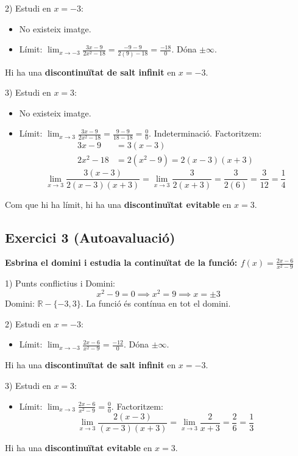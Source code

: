 \documentclass[12pt,a4paper]{article}
\begin{document}
2) Estudi en $x=-3$:
\begin{itemize}
    \item No existeix imatge.
    \item Límit: $\lim_{x \to -3} \frac{3x-9}{2x^2-18} = \frac{-9-9}{2(9)-18} = \frac{-18}{0}$. Dóna $\pm \infty$.
\end{itemize}
Hi ha una \textbf{discontinuïtat de salt infinit} en $x=-3$.

3) Estudi en $x=3$:
\begin{itemize}
    \item No existeix imatge.
    \item Límit: $\lim_{x \to 3} \frac{3x-9}{2x^2-18} = \frac{9-9}{18-18} = \frac{0}{0}$. Indeterminació. Factoritzem:
    \begin{align*}
        3x-9 &= 3(x-3) \\
        2x^2-18 &= 2(x^2-9) = 2(x-3)(x+3)
    \end{align*}
    \[ \lim_{x \to 3} \frac{3(x-3)}{2(x-3)(x+3)} = \lim_{x \to 3} \frac{3}{2(x+3)} = \frac{3}{2(6)} = \frac{3}{12} = \frac{1}{4} \]
\end{itemize}
Com que hi ha límit, hi ha una \textbf{discontinuïtat evitable} en $x=3$.

\vspace{0.5cm}

\subsection{Exercici 3 (Autoavaluació)}

\textbf{Esbrina el domini i estudia la continuïtat de la funció: $f(x) = \frac{2x-6}{x^2-9}$}

1) Punts conflictius i Domini:
\[ x^2-9 = 0 \implies x^2 = 9 \implies x = \pm 3 \]
Domini: $\mathbb{R} - \{-3, 3\}$. La funció és contínua en tot el domini.

2) Estudi en $x=-3$:
\begin{itemize}
    \item Límit: $\lim_{x \to -3} \frac{2x-6}{x^2-9} = \frac{-12}{0}$. Dóna $\pm \infty$.
\end{itemize}
Hi ha una \textbf{discontinuïtat de salt infinit} en $x=-3$.

3) Estudi en $x=3$:
\begin{itemize}
    \item Límit: $\lim_{x \to 3} \frac{2x-6}{x^2-9} = \frac{0}{0}$. Factoritzem:
    \[ \lim_{x \to 3} \frac{2(x-3)}{(x-3)(x+3)} = \lim_{x \to 3} \frac{2}{x+3} = \frac{2}{6} = \frac{1}{3} \]
\end{itemize}
Hi ha una \textbf{discontinuïtat evitable} en $x=3$.
\end{document}
